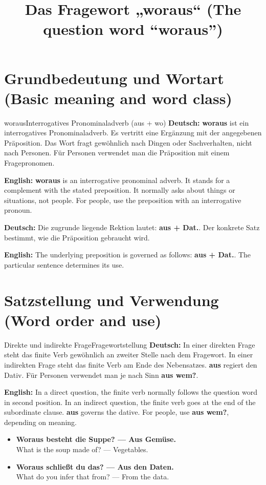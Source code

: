 \documentclass[a4paper,11pt]{article}
\title{Das Fragewort „woraus“ (The question word “woraus”)}
\date{}
\newcommand{\GermanText}[1]{\textbf{Deutsch: }#1\par}
\newcommand{\EnglishText}[1]{{\small\color{SoftGray}\textbf{English: }#1\par}}
\newcommand{\ExampleItem}[2]{\item \textbf{#1}\\{\small\color{SoftGray}#2}}
\begin{document}
\maketitle
\tableofcontents
\newpage
\section{Grundbedeutung und Wortart (Basic meaning and word class)}
\begin{grammarentry}{woraus}{Interrogatives Pronominaladverb (aus + wo)}
\GermanText{\textbf{woraus} ist ein interrogatives Pronominaladverb. Es vertritt eine Ergänzung mit der angegebenen Präposition. Das Wort fragt gewöhnlich nach Dingen oder Sachverhalten, nicht nach Personen. Für Personen verwendet man die Präposition mit einem Fragepronomen.}
\EnglishText{\textbf{woraus} is an interrogative pronominal adverb. It stands for a complement with the stated preposition. It normally asks about things or situations, not people. For people, use the preposition with an interrogative pronoun.}
\GermanText{Die zugrunde liegende Rektion lautet: \textbf{aus + Dat.}. Der konkrete Satz bestimmt, wie die Präposition gebraucht wird.}
\EnglishText{The underlying preposition is governed as follows: \textbf{aus + Dat.}. The particular sentence determines its use.}
\end{grammarentry}
\section{Satzstellung und Verwendung (Word order and use)}
\begin{grammarentry}{Direkte und indirekte Frage}{Fragewortstellung}
\GermanText{In einer direkten Frage steht das finite Verb gewöhnlich an zweiter Stelle nach dem Fragewort. In einer indirekten Frage steht das finite Verb am Ende des Nebensatzes. \textbf{aus} regiert den Dativ. Für Personen verwendet man je nach Sinn \textbf{aus wem?}.}
\EnglishText{In a direct question, the finite verb normally follows the question word in second position. In an indirect question, the finite verb goes at the end of the subordinate clause. \textbf{aus} governs the dative. For people, use \textbf{aus wem?}, depending on meaning.}
\end{grammarentry}
\begin{exbox}\begin{itemize}
\ExampleItem{Woraus besteht die Suppe? — Aus Gemüse.}{What is the soup made of? — Vegetables.}
\ExampleItem{Woraus schließt du das? — Aus den Daten.}{What do you infer that from? — From the data.}
\end{itemize}\end{exbox}
\end{document}
